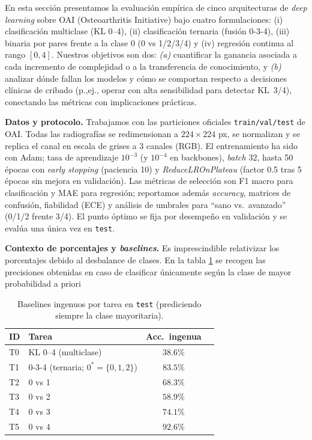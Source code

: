 \documentclass[11pt,spanish,listoffigures,listoftables]{tfgetsinf}
\begin{document}
En esta sección presentamos la evaluación empírica de cinco arquitecturas de \emph{deep learning} sobre OAI (Osteoarthritis Initiative) bajo cuatro formulaciones: (i) clasificación multiclase (KL 0--4), (ii) clasificación ternaria (fusión 0-3-4), (iii) binaria por pares frente a la clase 0 (0 vs 1/2/3/4) y (iv) regresión continua al rango $[0,4]$. Nuestros objetivos son dos: \textit{(a)} cuantificar la ganancia asociada a cada incremento de complejidad o a la transferencia de conocimiento, y \textit{(b)} analizar dónde fallan los modelos y cómo se comportan respecto a decisiones clínicas de cribado (p.,ej., operar con alta sensibilidad para detectar KL~3/4), conectando las métricas con implicaciones prácticas.

\textbf{Datos y protocolo.} Trabajamos con las particiones oficiales \texttt{train/val/test} de OAI. Todas las radiografías se redimensionan a $224{\times}224$ px, se normalizan y se replica el canal en escala de grises a 3 canales (RGB). El entrenamiento ha sido con Adam; tasa de aprendizaje $10^{-3}$ (y $10^{-4}$ en backbones), \emph{batch} 32, hasta 50 épocas con \emph{early stopping} (paciencia 10) y \emph{ReduceLROnPlateau} (factor 0.5 tras 5 épocas sin mejora en validación). Las métricas de selección son F1 macro para clasificación y MAE para regresión; reportamos además \textit{accuracy}, matrices de confusión, fiabilidad (ECE) y análisis de umbrales para “sano vs.\ avanzado” (0/1/2 frente 3/4). El punto óptimo se fija por desempeño en validación y se evalúa una única vez en \texttt{test}.

\noindent\textbf{Contexto de porcentajes y \emph{baselines}.} Es imprescindible relativizar los porcentajes debido al desbalance de clases. En la tabla \ref{tab:baselines_por_tarea} se recogen las precisiones obtenidas en caso de clasificar únicamente según la clase de mayor probabilidad a priori

\begin{table}[H]
	\centering
	\caption{Baselines ingenuos por tarea en \texttt{test} (prediciendo siempre la clase mayoritaria).}
	\label{tab:baselines_por_tarea}
	\begin{tabular}{l l c l}
		\toprule
		\textbf{ID} & \textbf{Tarea}                         & \textbf{Acc.\ ingenua} \\
		\midrule
		T0          & KL 0--4 (multiclase)                   & $38.6\%$               \\
		T1          & 0-3-4 (ternaria; $0^\ast{=}\{0,1,2\}$) & $83.5\%$               \\
		T2          & 0 vs 1                                 & $68.3\%$               \\
		T3          & 0 vs 2                                 & $58.9\%$               \\
		T4          & 0 vs 3                                 & $74.1\%$               \\
		T5          & 0 vs 4                                 & $92.6\%$               \\
		\bottomrule
	\end{tabular}
\end{table}
\end{document}

